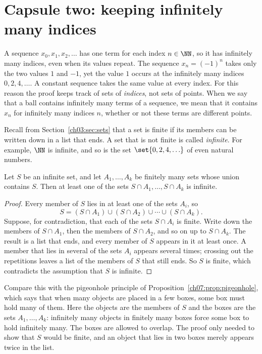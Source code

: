 \section{Capsule two: keeping infinitely many indices}\label{ch17:sec:pigeonhole}
A sequence $x_0,x_1,x_2,\ldots$ has one term for each index $n\in\NN$, so it has infinitely many indices, even when its values repeat. The sequence $x_n=(-1)^n$ takes only the two values $1$ and $-1$, yet the value $1$ occurs at the infinitely many indices $0,2,4,\ldots$. A constant sequence takes the same value at every index. For this reason the proof keeps track of sets of \emph{indices}, not sets of points. When we say that a ball contains infinitely many terms of a sequence, we mean that it contains $x_n$ for infinitely many indices $n$, whether or not these terms are different points.

Recall from Section~\ref{ch03:sec:sets} that a set is finite if its members can be written down in a list that ends. A set that is not finite is called \emph{infinite}. For example, $\NN$ is infinite, and so is the set $\set{0,2,4,\ldots}$ of even natural numbers.

\par\noindent\begin{minipage}{\linewidth}
\begin{lemma}\label{ch17:lem:pigeonhole}
Let $S$ be an infinite set, and let $A_1,\ldots,A_k$ be finitely many sets whose union contains $S$. Then at least one of the sets $S\cap A_1,\ldots,S\cap A_k$ is infinite.
\end{lemma}
\end{minipage}\par

\begin{proof}
Every member of $S$ lies in at least one of the sets $A_i$, so
\[
 S=(S\cap A_1)\cup(S\cap A_2)\cup\cdots\cup(S\cap A_k).
\]
Suppose, for contradiction, that each of the sets $S\cap A_i$ is finite. Write down the members of $S\cap A_1$, then the members of $S\cap A_2$, and so on up to $S\cap A_k$. The result is a list that ends, and every member of $S$ appears in it at least once. A member that lies in several of the sets $A_i$ appears several times; crossing out the repetitions leaves a list of the members of $S$ that still ends. So $S$ is finite, which contradicts the assumption that $S$ is infinite.
\end{proof}

Compare this with the pigeonhole principle of Proposition~\ref{ch07:prop:pigeonhole}, which says that when many objects are placed in a few boxes, some box must hold many of them. Here the objects are the members of $S$ and the boxes are the sets $A_1,\ldots,A_k$: infinitely many objects in finitely many boxes force some box to hold infinitely many. The boxes are allowed to overlap. The proof only needed to show that $S$ would be finite, and an object that lies in two boxes merely appears twice in the list.

